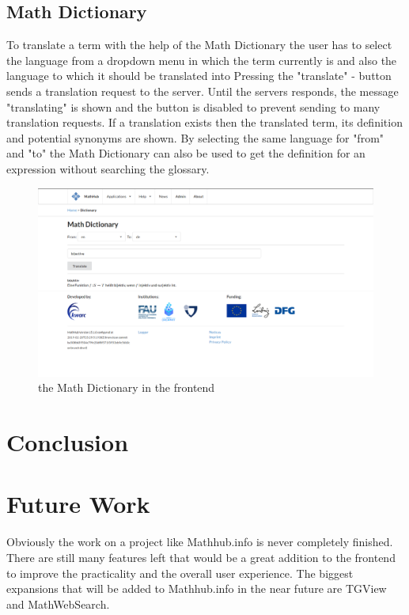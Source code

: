 \documentclass[11pt,a4paper]{article}
\begin{document}
\subsection{Math Dictionary}
To translate a term with the help of the Math Dictionary the user has to select the language from a dropdown menu in which the term currently is and also the language to which it should be translated into
Pressing the "translate" - button sends a translation request to the server.
Until the servers responds, the message "translating" is shown and the button is disabled to prevent sending to many translation requests.
If a translation exists then the translated term, its definition and potential synonyms are shown.
By selecting the same language for "from" and "to" the Math Dictionary can also be used to get the definition for an expression without searching the glossary.
\begin{figure}[H]
\includegraphics[width=1\textwidth]{dictionary.png}
\caption{the Math Dictionary in the frontend}
\end{figure}

\section{Conclusion}

\section{Future Work}
Obviously the work on a project like Mathhub.info is never completely finished.
There are still many features left that would be a great addition to the frontend to improve the practicality and the overall user experience.
The biggest expansions that will be added to Mathhub.info in the near future are TGView and MathWebSearch.
\end{document}
